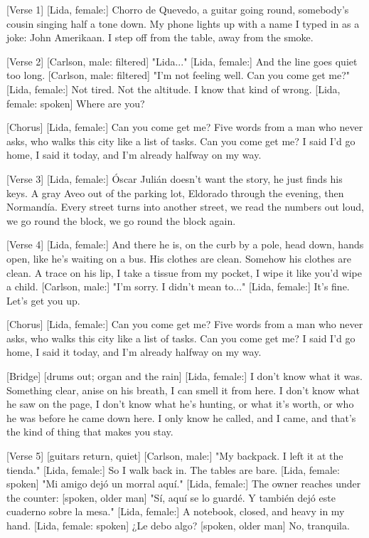 \begin{lyrics}

[Verse 1]
[Lida, female:]
Chorro de Quevedo, a guitar going round,
somebody's cousin singing half a tone down.
My phone lights up with a name I typed in as a joke:
John Amerikaan.
I step off from the table,
away from the smoke.

[Verse 2]
[Carlson, male: filtered] "Lida..."
[Lida, female:]
And the line goes quiet too long.
[Carlson, male: filtered] "I'm not feeling well.
Can you come get me?"
[Lida, female:]
Not tired. Not the altitude.
I know that kind of wrong.
[Lida, female: spoken]
Where are you?

[Chorus]
[Lida, female:]
Can you come get me?
Five words from a man who never asks,
who walks this city like a list of tasks.
Can you come get me?
I said I'd go home, I said it today,
and I'm already halfway on my way.

[Verse 3]
[Lida, female:]
Óscar Julián doesn't want the story,
he just finds his keys.
A gray Aveo out of the parking lot,
Eldorado through the evening, then Normandía.
Every street turns into another street,
we read the numbers out loud,
we go round the block,
we go round the block again.

[Verse 4]
[Lida, female:]
And there he is, on the curb by a pole,
head down, hands open, like he's waiting on a bus.
His clothes are clean. Somehow his clothes are clean.
A trace on his lip, I take a tissue from my pocket,
I wipe it like you'd wipe a child.
[Carlson, male:]
"I'm sorry. I didn't mean to..."
[Lida, female:]
It's fine. Let's get you up.

[Chorus]
[Lida, female:]
Can you come get me?
Five words from a man who never asks,
who walks this city like a list of tasks.
Can you come get me?
I said I'd go home, I said it today,
and I'm already halfway on my way.

[Bridge]
[drums out; organ and the rain]
[Lida, female:]
I don't know what it was. Something clear,
anise on his breath, I can smell it from here.
I don't know what he saw on the page,
I don't know what he's hunting, or what it's worth,
or who he was before he came down here.
I only know he called,
and I came,
and that's the kind of thing that makes you stay.

[Verse 5]
[guitars return, quiet]
[Carlson, male:]
"My backpack. I left it at the tienda."
[Lida, female:]
So I walk back in. The tables are bare.
[Lida, female: spoken] "Mi amigo dejó un morral aquí."
[Lida, female:] The owner reaches under the counter:
[spoken, older man]
"Sí, aquí se lo guardé.
Y también dejó este cuaderno sobre la mesa."
[Lida, female:]
A notebook, closed, and heavy in my hand.
[Lida, female: spoken]
¿Le debo algo?
[spoken, older man]
No, tranquila.


\end{lyrics}
